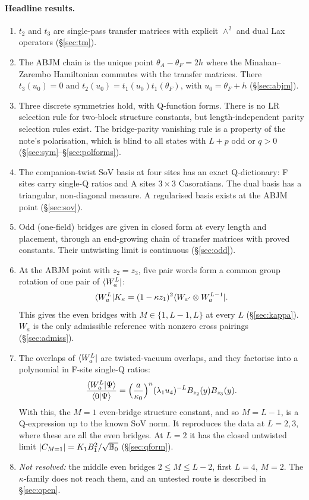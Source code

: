 \paragraph{Headline results.}
\begin{enumerate}
\item $t_2$ and $t_3$ are single-pass transfer matrices with explicit $\wedge^2$ and dual Lax operators (\S\ref{sec:tm}).
\item The ABJM chain is the unique point $\theta_A-\theta_F=2h$ where the Minahan--Zarembo Hamiltonian commutes with the
  transfer matrices. There $t_3(u_0)=0$ and $t_2(u_0)=t_1(u_0)t_1(\theta_F)$, with $u_0=\theta_F+h$ (\S\ref{sec:abjm}).
\item Three discrete symmetries hold, with Q-function forms. There is no LR selection rule for two-block structure
  constants, but length-independent parity selection rules exist. The bridge-parity vanishing rule is a property of the
  note's polarisation, which is blind to all states with $L+p$ odd or $q>0$
  (\S\ref{sec:sym}--\S\ref{sec:polforms}).
\item The companion-twist SoV basis at four sites has an exact Q-dictionary: F sites carry single-Q ratios and A sites
  $3\times3$ Casoratians. The dual basis has a triangular, non-diagonal measure. A regularised basis exists at the ABJM
  point (\S\ref{sec:sov}).
\item Odd (one-field) bridges are given in closed form at every length and placement, through an end-growing chain of
  transfer matrices with proved constants. Their untwisting limit is continuous (\S\ref{sec:odd}).
\item At the ABJM point with $z_2=z_3$, five pair words form a common group rotation of one pair of $\langle W_a^L|$:
  \[
  \langle W_a^L|K_\kappa=(1-\kappa z_1)^2\langle W_{a'}\otimes W_a^{L-1}|.
  \]
  This gives the even bridges with $M\in\{1,L-1,L\}$ at every $L$ (\S\ref{sec:kappa}). $W_a$ is the only admissible
  reference with nonzero cross pairings (\S\ref{sec:admiss}).
\item The overlaps of $\langle W_a^L|$ are twisted-vacuum overlaps, and they factorise into a polynomial in F-site
  single-Q ratios:
  \[
  \frac{\langle W_a^L|\Psi\rangle}{\langle0|\Psi\rangle}=\Big(\frac a{\kappa_0}\Big)^n(\lambda_1u_4)^{-L}B_{z_2}(y)B_{z_3}(y).
  \]
  With this, the $M=1$ even-bridge structure constant, and so $M=L-1$, is a Q-expression up to the known SoV norm. It
  reproduces the data at $L=2,3$, where these are all the even bridges. At $L=2$ it has the closed untwisted limit
  $|C_{M=1}|=K_1B_1^2/\sqrt{\mathbb B_0}$ (\S\ref{sec:qform}).
\item \emph{Not resolved:} the middle even bridges $2\le M\le L-2$, first $L=4$, $M=2$. The $\kappa$-family does not reach
  them, and an untested route is described in \S\ref{sec:open}.
\end{enumerate}

